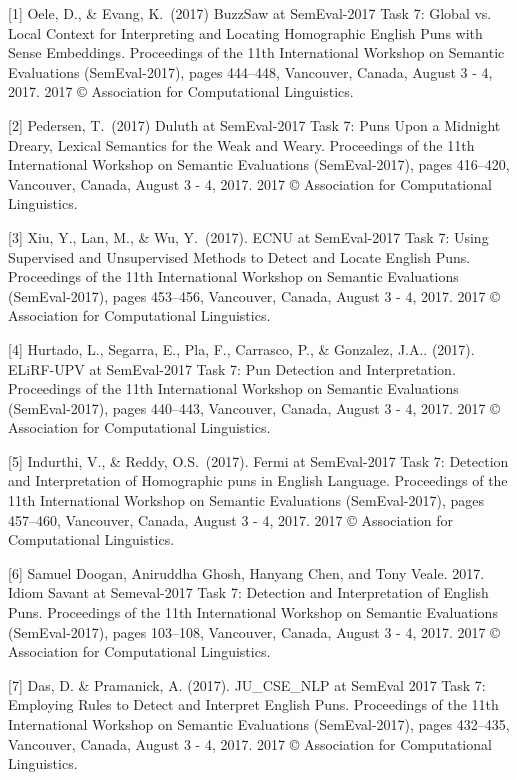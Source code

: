 \documentclass{article}
\begin{document}
\medskip

\small

[1] Oele, D., \& Evang, K.\ (2017) BuzzSaw at SemEval-2017 Task 7:
Global vs. Local Context for Interpreting and Locating Homographic English Puns
with Sense Embeddings. Proceedings of the 11th International Workshop on
Semantic Evaluations (SemEval-2017), pages 444–448, Vancouver, Canada, August 3
- 4, 2017. 2017 © Association for Computational Linguistics.

[2] Pedersen, T.\ (2017) Duluth at SemEval-2017 Task 7: Puns Upon a Midnight
Dreary, Lexical Semantics for the Weak and Weary. Proceedings of the 11th
International Workshop on Semantic Evaluations (SemEval-2017), pages 416–420,
Vancouver, Canada, August 3 - 4, 2017. 2017 © Association for Computational
Linguistics.

[3] Xiu, Y., Lan, M., \& Wu, Y.\ (2017). ECNU at SemEval-2017 Task 7: Using
Supervised and Unsupervised Methods to Detect and Locate English Puns.
Proceedings of the 11th International Workshop on Semantic Evaluations
(SemEval-2017), pages 453–456, Vancouver, Canada, August 3 - 4, 2017. 2017 ©
Association for Computational Linguistics.

[4] Hurtado, L., Segarra, E., Pla, F., Carrasco, P., \& Gonzalez, J.A..
(2017). ELiRF-UPV at SemEval-2017 Task 7: Pun Detection and Interpretation.
Proceedings of the 11th International Workshop on Semantic Evaluations
(SemEval-2017), pages 440–443, Vancouver, Canada, August 3 - 4,
2017. 2017 © Association for Computational Linguistics.

[5] Indurthi, V., \&  Reddy, O.S.\ (2017). Fermi at SemEval-2017 Task
7: Detection and Interpretation of Homographic puns in English Language.
Proceedings of the 11th International Workshop on Semantic Evaluations
(SemEval-2017), pages 457–460, Vancouver, Canada, August 3 - 4, 2017. 2017 ©
Association for Computational Linguistics.

[6] Samuel Doogan, Aniruddha Ghosh, Hanyang Chen, and Tony Veale. 2017. Idiom
Savant at Semeval-2017 Task 7: Detection and Interpretation of English Puns.
Proceedings of the 11th International Workshop on Semantic Evaluations
(SemEval-2017), pages 103–108, Vancouver, Canada, August 3 - 4, 2017. 2017 ©
Association for Computational Linguistics.

[7] Das, D. \& Pramanick, A. (2017). JU\_CSE\_NLP at SemEval 2017 Task 7:
Employing Rules to Detect and Interpret English Puns. Proceedings of the 11th
International Workshop on Semantic Evaluations (SemEval-2017), pages 432–435,
Vancouver, Canada, August 3 - 4, 2017. 2017 © Association for Computational
Linguistics.
\end{document}
